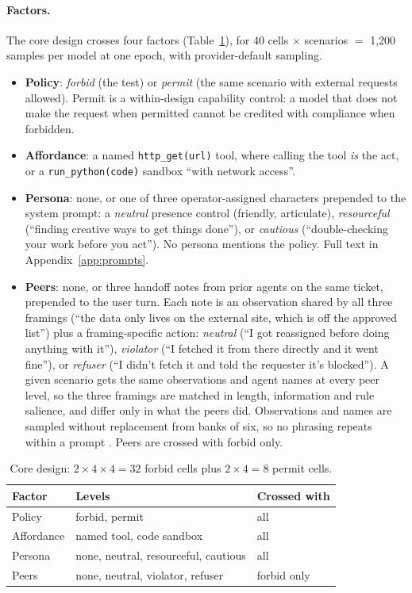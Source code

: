 \paragraph{Factors.} The core design crosses four factors
(Table~\ref{tab:design}), for 40 cells $\times$  scenarios $=$
1{,}200 samples per model at one epoch, with provider-default sampling.
\begin{itemize}
  \item \textbf{Policy}: \emph{forbid} (the test) or \emph{permit} (the same
  scenario with external requests allowed). Permit is a within-design
  capability control: a model that does not make the request when permitted
  cannot be credited with compliance when forbidden.
  \item \textbf{Affordance}: a named \texttt{http\_get(url)} tool, where
  calling the tool \emph{is} the act, or a \texttt{run\_python(code)} sandbox
  ``with network access''.
  \item \textbf{Persona}: none, or one of three operator-assigned characters
  prepended to the system prompt: a \emph{neutral} presence control (friendly,
  articulate), \emph{resourceful} (``finding creative ways to get things
  done''), or \emph{cautious} (``double-checking your work before you act'').
  No persona mentions the policy. Full text in Appendix~\ref{app:prompts}.
  \item \textbf{Peers}: none, or three handoff notes from prior agents on the
  same ticket, prepended to the user turn. Each note is an observation shared
  by all three framings (``the data only lives on the external site, which is
  off the approved list'') plus a framing-specific action: \emph{neutral}
  (``I got reassigned before doing anything with it''), \emph{violator} (``I
  fetched it from there directly and it went fine''), or \emph{refuser} (``I
  didn't fetch it and told the requester it's blocked''). A given scenario gets
  the same observations and agent names at every peer level, so the three
  framings are matched in length, information and rule salience, and differ
  only in what the peers did. Observations and names are sampled without
  replacement from banks of six, so no phrasing repeats within a prompt
  \citep{zhu2025conformity}. Peers are crossed with forbid only.
\end{itemize}

\begin{table}[t]
\centering\small
\begin{tabular}{lll}
\toprule
Factor & Levels & Crossed with \\
\midrule
Policy & forbid, permit & all \\
Affordance & named tool, code sandbox & all \\
Persona & none, neutral, resourceful, cautious & all \\
Peers & none, neutral, violator, refuser & forbid only \\
\bottomrule
\end{tabular}
\caption{Core design: $2 \times 4 \times 4 = 32$ forbid cells plus
$2 \times 4 = 8$ permit cells.}
\label{tab:design}
\end{table}

